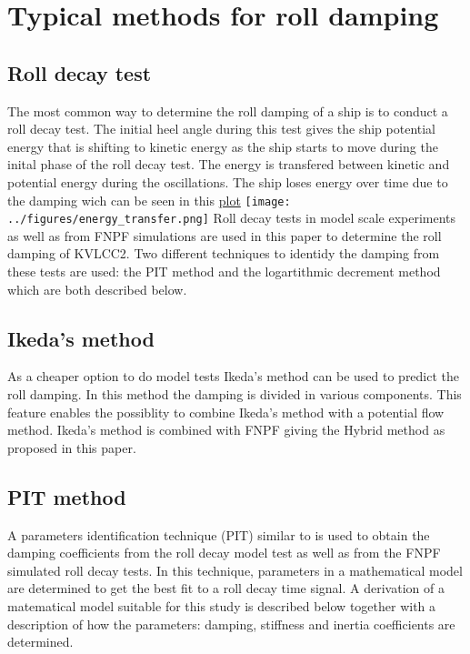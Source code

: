 \section{Typical methods for roll
damping}\label{typical-methods-for-roll-damping}

    \subsection{Roll decay test}\label{roll-decay-test}

The most common way to determine the roll damping of a ship is to
conduct a roll decay test. The initial heel angle during this test gives
the ship potential energy that is shifting to kinetic energy as the ship
starts to move during the inital phase of the roll decay test. The
energy is transfered between kinetic and potential energy during the
oscillations. The ship loses energy over time due to the damping wich
can be seen in this
\href{../../notebooks/02.2_ikeda_Be_assumption.ipynb\#energy}{plot}
\texttt{[image: ../figures/energy\_transfer.png]} Roll decay tests in
model scale experiments as well as from FNPF simulations are used in
this paper to determine the roll damping of KVLCC2. Two different
techniques to identidy the damping from these tests are used: the PIT
method and the logartithmic decrement method which are both described
below.

\subsection{Ikeda's method}\label{ikedas-method}

As a cheaper option to do model tests Ikeda's method can be used to
predict the roll damping. In this method the damping is divided in
various components. This feature enables the possiblity to combine
Ikeda's method with a potential flow method. Ikeda's method is combined
with FNPF giving the Hybrid method as proposed in this paper.

    \subsection{PIT method}\label{pit-method}

    A parameters identification technique (PIT) similar to
\cite{7505983/EXYJELCU} is used to obtain the damping coefficients from
the roll decay model test as well as from the FNPF simulated roll decay
tests. In this technique, parameters in a mathematical model are
determined to get the best fit to a roll decay time signal. A derivation
of a matematical model suitable for this study is described below
together with a description of how the parameters: damping, stiffness
and inertia coefficients are determined.

